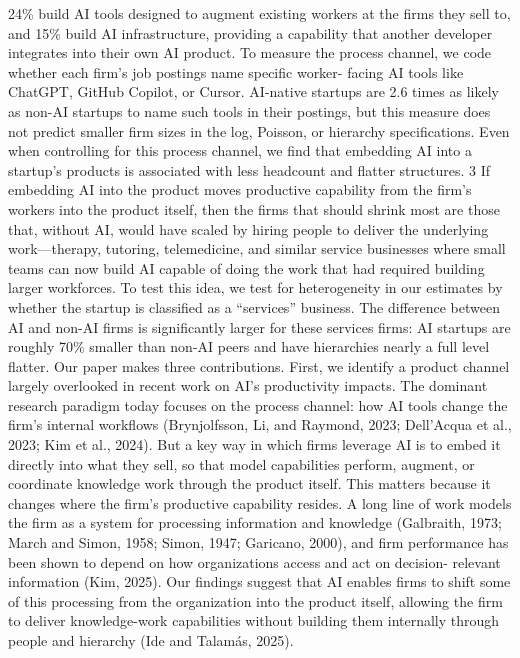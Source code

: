24\% build AI tools designed to augment existing workers at the firms they sell to, and 15\% build AI
infrastructure, providing a capability that another developer integrates into their own AI product.
To measure the process channel, we code whether each firm’s job postings name specific worker-
facing AI tools like ChatGPT, GitHub Copilot, or Cursor. AI-native startups are 2.6 times as likely
as non-AI startups to name such tools in their postings, but this measure does not predict smaller
firm sizes in the log, Poisson, or hierarchy specifications. Even when controlling for this process
channel, we find that embedding AI into a startup’s products is associated with less headcount and
flatter structures.
3
If embedding AI into the product moves productive capability from the firm’s workers into
the product itself, then the firms that should shrink most are those that, without AI, would have
scaled by hiring people to deliver the underlying work—therapy, tutoring, telemedicine, and similar
service businesses where small teams can now build AI capable of doing the work that had required
building larger workforces. To test this idea, we test for heterogeneity in our estimates by whether
the startup is classified as a “services” business. The difference between AI and non-AI firms is
significantly larger for these services firms: AI startups are roughly 70\% smaller than non-AI peers
and have hierarchies nearly a full level flatter.
Our paper makes three contributions. First, we identify a product channel largely overlooked
in recent work on AI’s productivity impacts. The dominant research paradigm today focuses on
the process channel: how AI tools change the firm’s internal workflows (Brynjolfsson, Li, and
Raymond, 2023; Dell’Acqua et al., 2023; Kim et al., 2024). But a key way in which firms leverage
AI is to embed it directly into what they sell, so that model capabilities perform, augment, or
coordinate knowledge work through the product itself. This matters because it changes where the
firm’s productive capability resides. A long line of work models the firm as a system for processing
information and knowledge (Galbraith, 1973; March and Simon, 1958; Simon, 1947; Garicano, 2000),
and firm performance has been shown to depend on how organizations access and act on decision-
relevant information (Kim, 2025). Our findings suggest that AI enables firms to shift some of this
processing from the organization into the product itself, allowing the firm to deliver knowledge-work
capabilities without building them internally through people and hierarchy (Ide and Talamás, 2025).
